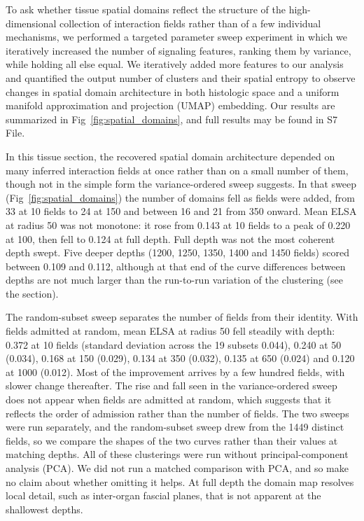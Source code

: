 \documentclass[10pt,letterpaper]{article}
\begin{document}
To ask whether tissue spatial domains reflect the structure of the high-dimensional collection of interaction fields rather than of a few individual mechanisms, we performed a targeted parameter sweep experiment in which we iteratively increased the number of signaling features, ranking them by variance, while holding all else equal. We iteratively added more features to our analysis and quantified the output number of clusters and their spatial entropy to observe changes in spatial domain architecture in both histologic space and a uniform manifold approximation and projection (UMAP) embedding. Our results are summarized in Fig~\ref{fig:spatial_domains}, and full results may be found in S7 File.

In this tissue section, the recovered spatial domain architecture depended on many inferred interaction fields at once rather than on a small number of them, though not in the simple form the variance-ordered sweep suggests. In that sweep (Fig~\ref{fig:spatial_domains}) the number of domains fell as fields were added, from 33 at 10 fields to 24 at 150 and between 16 and 21 from 350 onward. Mean ELSA at radius 50 was not monotone: it rose from 0.143 at 10 fields to a peak of 0.220 at 100, then fell to 0.124 at full depth. Full depth was not the most coherent depth swept. Five deeper depths (1200, 1250, 1350, 1400 and 1450 fields) scored between 0.109 and 0.112, although at that end of the curve differences between depths are not much larger than the run-to-run variation of the clustering (see the  section).

The random-subset sweep separates the number of fields from their identity. With fields admitted at random, mean ELSA at radius 50 fell steadily with depth: 0.372 at 10 fields (standard deviation across the 19 subsets 0.044), 0.240 at 50 (0.034), 0.168 at 150 (0.029), 0.134 at 350 (0.032), 0.135 at 650 (0.024) and 0.120 at 1000 (0.012). Most of the improvement arrives by a few hundred fields, with slower change thereafter. The rise and fall seen in the variance-ordered sweep does not appear when fields are admitted at random, which suggests that it reflects the order of admission rather than the number of fields. The two sweeps were run separately, and the random-subset sweep drew from the 1449 distinct fields, so we compare the shapes of the two curves rather than their values at matching depths. All of these clusterings were run without principal-component analysis (PCA). We did not run a matched comparison with PCA, and so make no claim about whether omitting it helps. At full depth the domain map resolves local detail, such as inter-organ fascial planes, that is not apparent at the shallowest depths.
\end{document}
